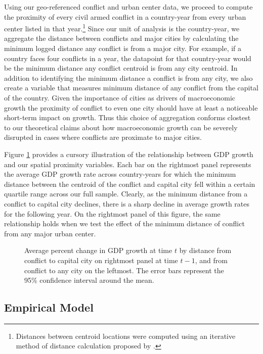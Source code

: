 Using our geo-referenced conflict and urban center data, we proceed to compute the proximity of every civil armed conflict in a country-year from every urban center listed in that year.\footnote{Distances between centroid locations were computed using an iterative method of distance calculation proposed by \citet{vincenty:1975}.} Since our unit of analysis is the country-year, we aggregate the distance between conflicts and major cities by calculating the minimum logged distance any conflict is from a major city. For example, if a country faces four conflicts in a year, the datapoint for that country-year would be the minimum distance any conflict centroid is from any city centroid. In addition to identifying the minimum distance a conflict is from any city, we also create a variable that measures minimum distance of any conflict from the capital of the country. Given the importance of cities as drivers of macroeconomic growth the proximity of conflict to even one city should have at least a noticeable short-term impact on growth. Thus this choice of aggregation conforms clostest to our theoretical claims about how macroeconomic growth can be severely disrupted in cases where conflicts are proximate to major cities. 

Figure \ref{fig:distGdp} provides a cursory illustration of the relationship between GDP growth and our spatial proximity variables. Each bar on the rightmost panel represents the average GDP growth rate across country-years for which the minimum distance between the centroid of the conflict and capital city fell within a certain quartile range across our full sample. Clearly, as the minimum distance from a conflict to capital city declines, there is a sharp decline in average growth rates for the following year. On the rightmost panel of this figure, the same relationship holds when we test the effect of the minimum distance of conflict from any major urban center. 

\begin{figure}
	\centering
	\resizebox{.8\textwidth}{!}{}
	\caption{Average percent change in GDP growth at time $t$ by distance from conflict to capital city on rightmost panel at time $t-1$, and from conflict to any city on the leftmost. The error bars represent the 95\% confidence interval around the mean.}
	\label{fig:distGdp}
\end{figure}

\subsection{Empirical Model}

